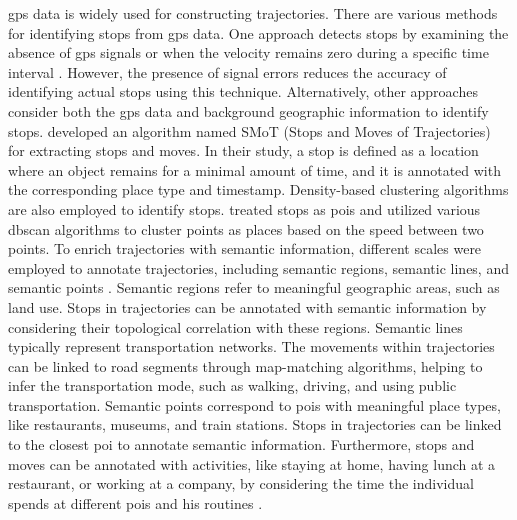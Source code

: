\documentclass{article}
\theoremstyle{remark}
\begin{document}
\acrfull{gps} data is widely used for constructing trajectories. There are various methods for identifying stops from \acrshort{gps} data. One approach detects stops by examining the absence of \acrshort{gps} signals or when the velocity remains zero during a specific time interval \citep{ashbrook_using_2003}. However, the presence of signal errors reduces the accuracy of identifying actual stops using this technique. Alternatively, other approaches consider both the \acrshort{gps} data and background geographic information to identify stops. \cite{alvares_model_2007} developed an algorithm named SMoT (Stops and Moves of Trajectories) for extracting stops and moves. In their study, a stop is defined as a location where an object remains for a minimal amount of time, and it is annotated with the corresponding place type and timestamp. Density-based clustering algorithms are also employed to identify stops. \cite{palma_clustering-based_2008} treated stops as \acrshort{poi}s and utilized various \acrshort{dbscan} algorithms to cluster points as places based on the speed between two points. To enrich trajectories with semantic information, different scales were employed to annotate trajectories, including semantic regions, semantic lines, and semantic points \citep{yan_semantic_2013}. Semantic regions refer to meaningful geographic areas, such as land use. Stops in trajectories can be annotated with semantic information by considering their topological correlation with these regions. Semantic lines typically represent transportation networks. The movements within trajectories can be linked to road segments through map-matching algorithms, helping to infer the transportation mode, such as walking, driving, and using public transportation. Semantic points correspond to \acrshort{poi}s with meaningful place types, like restaurants, museums, and train stations. Stops in trajectories can be linked to the closest \acrshort{poi} to annotate semantic information. Furthermore, stops and moves can be annotated with activities, like staying at home, having lunch at a restaurant, or working at a company, by considering the time the individual spends at different \acrshort{poi}s and his routines \citep{parent_semantic_2013}.
\end{document}

